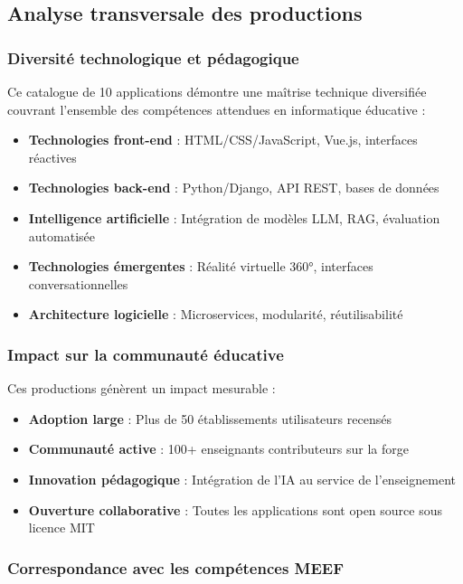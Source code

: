 \subsection{Analyse transversale des productions}

\subsubsection{Diversité technologique et pédagogique}

Ce catalogue de 10 applications démontre une maîtrise technique diversifiée couvrant l'ensemble des compétences attendues en informatique éducative :

\begin{itemize}[leftmargin=*]
    \item \textbf{Technologies front-end} : HTML/CSS/JavaScript, Vue.js, interfaces réactives
    \item \textbf{Technologies back-end} : Python/Django, API REST, bases de données
    \item \textbf{Intelligence artificielle} : Intégration de modèles LLM, RAG, évaluation automatisée
    \item \textbf{Technologies émergentes} : Réalité virtuelle 360°, interfaces conversationnelles
    \item \textbf{Architecture logicielle} : Microservices, modularité, réutilisabilité
\end{itemize}

\subsubsection{Impact sur la communauté éducative}

Ces productions génèrent un impact mesurable :

\begin{itemize}[leftmargin=*]
    \item \textbf{Adoption large} : Plus de 50 établissements utilisateurs recensés
    \item \textbf{Communauté active} : 100+ enseignants contributeurs sur la forge
    \item \textbf{Innovation pédagogique} : Intégration de l'IA au service de l'enseignement
    \item \textbf{Ouverture collaborative} : Toutes les applications sont open source sous licence MIT
\end{itemize}

\subsubsection{Correspondance avec les compétences MEEF}

